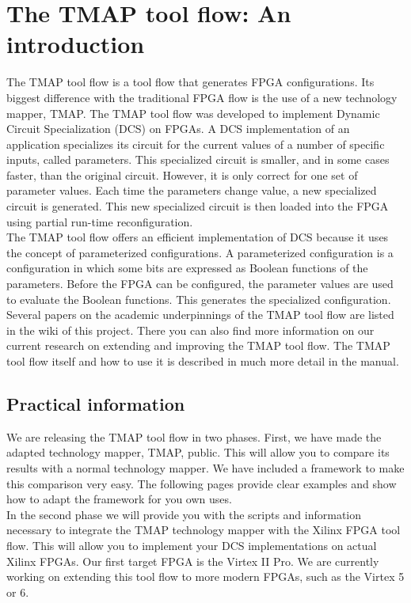 \documentclass[a4paper]{memoir}
\begin{document}
\let\clearforchapter\par %
\chapter{The TMAP tool flow: An introduction}

The TMAP tool flow is a tool flow that generates FPGA configurations. 
Its biggest difference with the traditional FPGA flow is the use of a new technology mapper, TMAP. 
The TMAP tool flow was developed to implement Dynamic Circuit Specialization (DCS) on FPGAs. 
A DCS implementation of an application specializes its circuit for the current values of a number of specific inputs, called parameters. This specialized circuit is smaller, and in some cases faster, than the original circuit. However,
it is only correct for one set of parameter values. Each time the parameters change value, a new specialized circuit is generated. This new specialized circuit is then loaded into the FPGA using partial run-time reconfiguration.\\

The TMAP tool flow offers an efficient implementation of DCS because it uses the concept of parameterized configurations. A parameterized configuration is a configuration in which some bits are expressed as Boolean functions of the parameters. Before the FPGA can be configured,
the parameter values are used to evaluate the Boolean functions. This generates the specialized configuration. Several papers on the academic underpinnings of the TMAP tool flow are listed in the wiki of this project. There you can also find more information on our current research on extending and improving the TMAP tool flow. The TMAP tool flow itself and how to use it is described in much more detail in the manual.

\section{Practical information}

We are releasing the TMAP tool flow in two phases. First, we have made the adapted technology mapper, TMAP, public. This will allow you to compare its results with a normal technology mapper. We have included a framework to make this comparison very easy. The following pages provide clear examples and show how to adapt the framework for you own uses.\\

In the second phase we will provide you with the scripts and information necessary to integrate the TMAP technology mapper with the Xilinx FPGA tool flow. This will allow you to implement your DCS implementations on actual Xilinx FPGAs. Our first target FPGA is the Virtex II Pro. We are currently working on extending this tool flow to more modern FPGAs, such as the Virtex 5 or 6.
\end{document}
